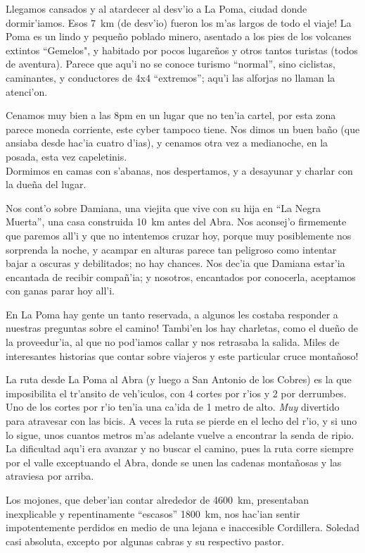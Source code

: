 Llegamos cansados y al atardecer al desv'io a La Poma, ciudad donde
dormir'iamos. \textexclamdown Esos 7~km (de desv'io) fueron los m'as largos de
todo el viaje! La Poma es un lindo y peque\~no poblado minero, asentado a los
pies de los volcanes extintos ``Gemelos", y habitado por pocos lugare\~nos y
otros tantos turistas (todos de aventura). Parece que aqu'i no se conoce turismo
``normal'', sino ciclistas, caminantes, y conductores de 4x4 ``extremos''; aqu'i
las alforjas no llaman la atenci'on.

Cenamos muy bien a las 8pm en un lugar que no ten'ia cartel, por esta zona
parece moneda corriente, este cyber tampoco tiene. Nos dimos un buen ba\~no
(que ansiaba desde hac'ia cuatro d'ias), y cenamos otra vez a medianoche, en la
posada, esta vez capeletinis.\\

Dormimos en camas con s'abanas, nos despertamos, y a desayunar y charlar con la
due\~na del lugar.

Nos cont'o sobre Damiana, una viejita que vive con su hija en ``La Negra
Muerta'', una casa construida 10~km antes del Abra. Nos aconsej'o firmemente que
paremos all'i y que no intentemos cruzar hoy, porque muy posiblemente nos
sorprenda la noche, y acampar en alturas parece tan peligroso como intentar
bajar a oscuras y debilitados; no hay chances. Nos dec'ia que Damiana estar'ia
encantada de recibir compa\~n'ia; y nosotros, encantados por conocerla,
aceptamos con ganas parar hoy all'i.

En La Poma hay gente un tanto reservada, \textexclamdown a algunos les costaba
responder a nuestras preguntas sobre el camino! Tambi'en los hay charletas, como
el due\~no de la proveedur'ia, al que no pod'iamos callar y nos retrasaba la
salida. \textexclamdown Miles de interesantes historias que contar sobre
viajeros y este particular cruce monta\~noso!

La ruta desde La Poma al Abra (y luego a San Antonio de los Cobres) es la que
imposibilita el tr'ansito de veh'iculos, con 4 cortes por r'ios y 2 por
derrumbes. Uno de los cortes por r'io ten'ia una ca'ida de 1 metro de alto.
\emph{Muy} divertido para atravesar con las bicis. A veces la ruta se pierde en
el lecho del r'io, y si uno lo sigue, unos cuantos metros m'as adelante vuelve a
encontrar la senda de ripio. La dificultad aqu'i era avanzar y no buscar el
camino, pues la ruta corre siempre por el valle exceptuando el Abra, donde se
unen las cadenas monta\~nosas y las atraviesa por arriba.

Los mojones, que deber'ian contar alrededor de 4600~km, presentaban inexplicable
y repentinamente ``escasos'' 1800~km, nos hac'ian sentir impotentemente perdidos
en medio de una lejana e inaccesible Cordillera. Soledad casi absoluta, excepto
por algunas cabras y su respectivo pastor.

